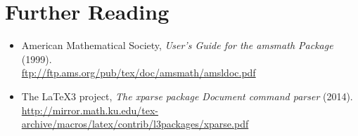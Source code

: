 \documentclass[a4paper,10pt]{scrartcl}
\begin{document}
\section{Further Reading}
\begin{itemize}
  \item American Mathematical Society, \emph{User’s Guide for the amsmath Package} (1999). \\
    \url{ftp://ftp.ams.org/pub/tex/doc/amsmath/amsldoc.pdf}
  \item The \LaTeX 3 project, \emph{The xparse package Document command parser} (2014). \\
    \url{http://mirror.math.ku.edu/tex-archive/macros/latex/contrib/l3packages/xparse.pdf}
\end{itemize}
\end{document}
